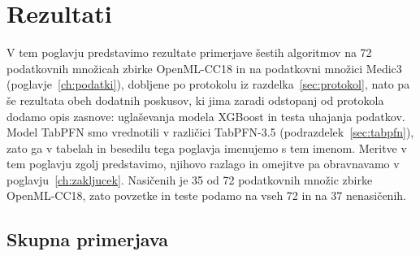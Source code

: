 \documentclass[a4paper,12pt,openright]{book}
\begin{document}
\chapter{Rezultati}
\label{ch:rezultati}


V tem poglavju predstavimo rezultate primerjave šestih algoritmov na
72 podatkovnih množicah zbirke OpenML-CC18 in na podatkovni množici Medic3
(poglavje~\ref{ch:podatki}), dobljene po protokolu iz
razdelka~\ref{sec:protokol}, nato pa še rezultata obeh dodatnih poskusov, ki
jima zaradi odstopanj od protokola dodamo opis zasnove: uglaševanja modela
XGBoost in testa uhajanja podatkov. Model TabPFN smo vrednotili v različici
TabPFN-3.5 (podrazdelek~\ref{sec:tabpfn}), zato ga v tabelah in besedilu tega
poglavja imenujemo s tem imenom. Meritve v tem poglavju zgolj predstavimo,
njihovo razlago in omejitve pa obravnavamo v poglavju~\ref{ch:zakljucek}.
Nasičenih je 35 od 72 podatkovnih množic zbirke OpenML-CC18, zato povzetke in
teste podamo na vseh 72 in na 37 nenasičenih.

\section{Skupna primerjava}
\label{sec:rez-skupno}
\end{document}
